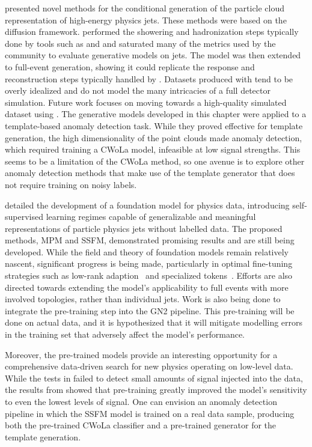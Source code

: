  presented novel methods for the conditional generation of the particle cloud representation of high-energy physics jets.
These methods were based on the diffusion framework.
\pcdroid performed the showering and hadronization steps typically done by tools such as \pythia and \herwig and saturated many of the metrics used by the community to evaluate generative models on jets.
The model was then extended to full-event generation, showing it could replicate the response and reconstruction steps typically handled by \delphes.
Datasets produced with \delphes tend to be overly idealized and do not model the many intricacies of a full detector simulation.
Future work focuses on moving towards a high-quality simulated dataset using \geant.
The generative models developed in this chapter were applied to a template-based anomaly detection task.
While they proved effective for template generation, the high dimensionality of the point clouds made anomaly detection, which required training a CWoLa model, infeasible at low signal strengths.
This seems to be a limitation of the CWoLa method, so one avenue is to explore other anomaly detection methods that make use of the template generator that does not require training on noisy labels.

 detailed the development of a foundation model for physics data, introducing self-supervised learning regimes capable of generalizable and meaningful representations of particle physics jets without labelled data.
The proposed methods, MPM and SSFM, demonstrated promising results and are still being developed.
While the field and theory of foundation models remain relatively nascent, significant progress is being made, particularly in optimal fine-tuning strategies such as low-rank adaption~\cite{LoRALowRankAdaptation} and specialized tokens~\cite{ParameterEfficientTuningSpecial}.
Efforts are also directed towards extending the model's applicability to full events with more involved topologies, rather than individual jets.
Work is also being done to integrate the pre-training step into the GN2 pipeline.
This pre-training will be done on actual data, and it is hypothesized that it will mitigate modelling errors in the training set that adversely affect the model's performance.

Moreover, the pre-trained models provide an interesting opportunity for a comprehensive data-driven search for new physics operating on low-level data.
While the tests in  failed to detect small amounts of signal injected into the data, the results from  showed that pre-training greatly improved the model's sensitivity to even the lowest levels of signal.
One can envision an anomaly detection pipeline in which the SSFM model is trained on a real data sample, producing both the pre-trained CWoLa classifier and a pre-trained generator for the template generation.

